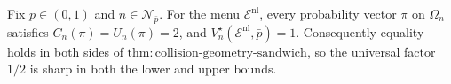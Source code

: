 Fix \(\bar p\in(0,1)\) and \(n\in\mathcal N_{\bar p}\). For the menu \(\mathcal E^{\mathrm{nl}}\), every probability vector \(\pi\) on \(\Omega_n\) satisfies \(C_n(\pi)=U_n(\pi)=2\), and \(V_n^\star(\mathcal E^{\mathrm{nl}},\bar p)=1\). Consequently equality holds in both sides of \(\mathrm{thm{:}collision\text{-}geometry\text{-}sandwich}\), so the universal factor \(1/2\) is sharp in both the lower and upper bounds.
